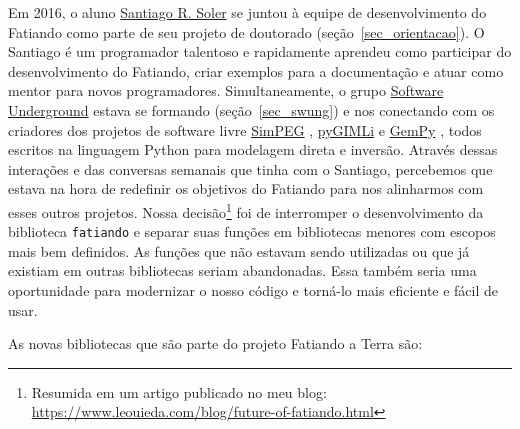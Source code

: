 \documentclass[10pt,a4paper,oneside]{book}
\newcommand{\SantiagoLink}{\href{https://www.santisoler.com/}{Santiago R. Soler}}
\begin{document}
Em 2016, o aluno \SantiagoLink{} se juntou à equipe de desenvolvimento do
Fatiando como parte de seu projeto de doutorado (seção~\ref{sec_orientacao}).
O Santiago é um programador talentoso e rapidamente aprendeu como participar
do desenvolvimento do Fatiando, criar exemplos para a documentação e atuar como
mentor para novos programadores.
Simultaneamente, o grupo
\href{https://softwareunderground.org/}{Software Underground} estava se
formando (seção~\ref{sec_swung}) e nos conectando com os criadores dos projetos
de software livre
\href{https://simpeg.xyz/}{SimPEG} \citep{Cockett2015},
\href{https://www.pygimli.org}{pyGIMLi} \citep{Rucker2017} e
\href{https://www.gempy.org/}{GemPy} \citep{delaVarga2019},
todos escritos na linguagem Python para modelagem direta e inversão.
Através dessas interações e das conversas semanais que tinha com o Santiago,
percebemos que estava na hora de redefinir os objetivos do Fatiando para
nos alinharmos com esses outros projetos.
Nossa decisão\footnote{Resumida em um artigo publicado no meu blog:
\url{https://www.leouieda.com/blog/future-of-fatiando.html}} foi de
interromper o desenvolvimento da biblioteca \texttt{fatiando} e separar suas
funções em bibliotecas menores com escopos mais bem definidos.
As funções que não estavam sendo utilizadas ou que já existiam em outras
bibliotecas seriam abandonadas.
Essa também seria uma oportunidade para modernizar o nosso código e torná-lo
mais eficiente e fácil de usar.

As novas bibliotecas que são parte do projeto Fatiando a Terra são:
\end{document}
